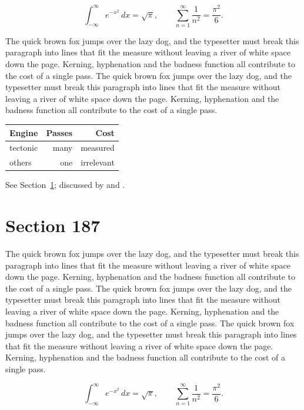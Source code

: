 \documentclass{article}
\begin{document}
\begin{equation}\label{eq:186}
\int_{-\infty}^{\infty} e^{-x^{2}}\,dx = \sqrt{\pi}, \qquad
\sum_{n=1}^{\infty} \frac{1}{n^{2}} = \frac{\pi^{2}}{6}.
\end{equation}

The quick brown fox jumps over the lazy dog, and the typesetter must break this paragraph into lines that fit the measure without leaving a river of white space down the page. Kerning, hyphenation and the badness function all contribute to the cost of a single pass. The quick brown fox jumps over the lazy dog, and the typesetter must break this paragraph into lines that fit the measure without leaving a river of white space down the page. Kerning, hyphenation and the badness function all contribute to the cost of a single pass. 

\begin{center}
\begin{tabular}{lrr}
\toprule
Engine & Passes & Cost \\
\midrule
tectonic & many & measured \\
others & one & irrelevant \\
\bottomrule
\end{tabular}
\end{center}

See Section~\ref{sec:187}; discussed by \textcite{k2} and \textcite{l4}.
\section{Section 187}
\label{sec:187}
The quick brown fox jumps over the lazy dog, and the typesetter must break this paragraph into lines that fit the measure without leaving a river of white space down the page. Kerning, hyphenation and the badness function all contribute to the cost of a single pass. The quick brown fox jumps over the lazy dog, and the typesetter must break this paragraph into lines that fit the measure without leaving a river of white space down the page. Kerning, hyphenation and the badness function all contribute to the cost of a single pass. The quick brown fox jumps over the lazy dog, and the typesetter must break this paragraph into lines that fit the measure without leaving a river of white space down the page. Kerning, hyphenation and the badness function all contribute to the cost of a single pass. 

\begin{equation}\label{eq:187}
\int_{-\infty}^{\infty} e^{-x^{2}}\,dx = \sqrt{\pi}, \qquad
\sum_{n=1}^{\infty} \frac{1}{n^{2}} = \frac{\pi^{2}}{6}.
\end{equation}
\end{document}

